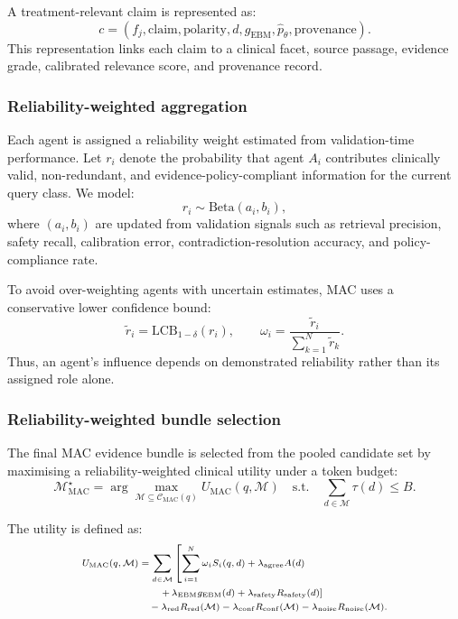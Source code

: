 \documentclass[conference]{IEEEtran}
\begin{document}
A treatment-relevant claim is represented as:
\[
c =
(f_j,\mathrm{claim},\mathrm{polarity},d,g_{\mathrm{EBM}},
\widehat{p}_{\theta},\mathrm{provenance}).
\]
This representation links each claim to a clinical facet, source passage, evidence grade, calibrated relevance score, and provenance record.

\subsubsection*{Reliability-weighted aggregation}

Each agent is assigned a reliability weight estimated from validation-time performance. Let $r_i$ denote the probability that agent $A_i$ contributes clinically valid, non-redundant, and evidence-policy-compliant information for the current query class. We model:
\[
r_i\sim\mathrm{Beta}(a_i,b_i),
\]
where $(a_i,b_i)$ are updated from validation signals such as retrieval precision, safety recall, calibration error, contradiction-resolution accuracy, and policy-compliance rate.

To avoid over-weighting agents with uncertain estimates, MAC uses a conservative lower confidence bound:
\[
\widetilde{r}_i
=
\mathrm{LCB}_{1-\delta}(r_i),
\qquad
\omega_i
=
\frac{\widetilde{r}_i}
{\sum_{k=1}^{N}\widetilde{r}_k}.
\]
Thus, an agent's influence depends on demonstrated reliability rather than its assigned role alone.

\subsubsection*{Reliability-weighted bundle selection}

The final MAC evidence bundle is selected from the pooled candidate set by maximising a reliability-weighted clinical utility under a token budget:
\begin{equation}
\label{eq:mac-selection}
\mathcal{M}_{\mathrm{MAC}}^{\star}
=
\arg\max_{\mathcal{M}\subseteq\mathcal{C}_{\mathrm{MAC}}(q)}
U_{\mathrm{MAC}}(q,\mathcal{M})
\quad
\text{s.t.}
\quad
\sum_{d\in\mathcal{M}}\tau(d)\le B.
\end{equation}

The utility is defined as:
\begin{equation}
\label{eq:mac-utility}
\scriptsize
\begin{aligned}
U_{\mathrm{MAC}}(q,\mathcal{M}) 
&= \sum_{d\in\mathcal{M}} \left[ \sum_{i=1}^{N}\omega_i S_i(q,d) + \lambda_{\mathrm{agree}}A(d) \right. \\
&\qquad \left. + \,\lambda_{\mathrm{EBM}}g_{\mathrm{EBM}}(d) + \lambda_{\mathrm{safety}}R_{\mathrm{safety}}(d) \right] \\
&\quad - \lambda_{\mathrm{red}}R_{\mathrm{red}}(\mathcal{M}) - \lambda_{\mathrm{conf}}R_{\mathrm{conf}}(\mathcal{M}) - \lambda_{\mathrm{noise}}R_{\mathrm{noise}}(\mathcal{M}).
\end{aligned}
\end{equation}
\end{document}
